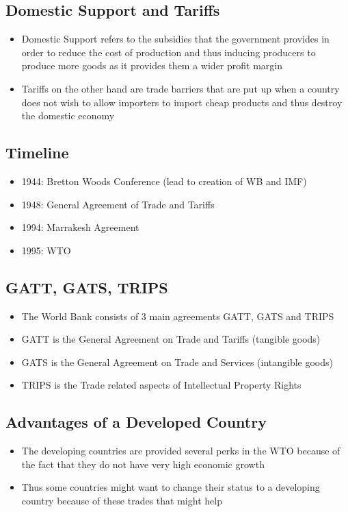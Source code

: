 \documentclass[11pt]{article}
\begin{document}
\subsection{Domestic Support and Tariffs}
\label{sec:orga4b94e0}
\begin{itemize}
\item Domestic Support refers to the subsidies that the government provides in order to reduce the cost of production and thus inducing producers to produce more goods as it provides them a wider profit margin
\item Tariffs on the other hand are trade barriers that are put up when a country does not wish to allow importers to import cheap products and thus destroy the domestic economy
\end{itemize}

\subsection{Timeline}
\label{sec:org0e97899}
\begin{itemize}
\item 1944: Bretton Woods Conference (lead to creation of WB and IMF)
\item 1948: General Agreement of Trade and Tariffs
\item 1994: Marrakesh Agreement
\item 1995: WTO
\end{itemize}

\subsection{GATT, GATS, TRIPS}
\label{sec:orgf2de63f}
\begin{itemize}
\item The World Bank consists of 3 main agreements GATT, GATS and TRIPS
\item GATT is the General Agreement on Trade and Tariffs (tangible goods)
\item GATS is the General Agreement on Trade and Services (intangible goods)
\item TRIPS is the Trade related aspects of Intellectual Property Rights
\end{itemize}

\subsection{Advantages of a Developed Country}
\label{sec:org9ee9b50}
\begin{itemize}
\item The developing countries are provided several perks in the WTO because of the fact that they do not have very high economic growth
\item Thus some countries might want to change their status to a developing country because of these trades that might help
\end{itemize}
\end{document}
